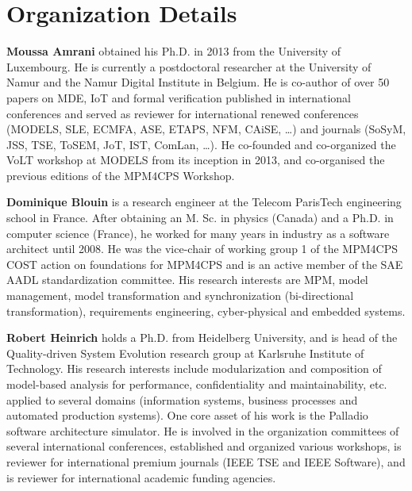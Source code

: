 \section{Organization Details}
\noindent
\textbf{Moussa Amrani} obtained his Ph.D. in 2013 from the University of Luxembourg. He is currently a postdoctoral researcher at the University of Namur and the Namur Digital Institute in Belgium. 
He is co-author of over 50 papers on MDE, IoT and formal verification published in international conferences and served as reviewer for international renewed conferences (MODELS, SLE, ECMFA, ASE, ETAPS, NFM, CAiSE, \ldots) and journals (SoSyM, JSS, TSE, ToSEM, JoT, IST, ComLan, \ldots). He co-founded and co-organized the VoLT workshop at MODELS from its inception in 2013, and co-organised
the previous editions of the MPM4CPS Workshop.

\noindent
\textbf{Dominique Blouin} is a research engineer at the Telecom ParisTech engineering school in France. 
After obtaining an M. Sc. in physics (Canada) and a Ph.D. in computer science (France), he worked for many years in industry as a software architect until 2008. He was the vice-chair of working group 1 of the MPM4CPS COST action on foundations for MPM4CPS and is an active member of the SAE AADL standardization committee. 
His research interests are MPM, model management, model transformation and synchronization (bi-directional transformation), requirements engineering, cyber-physical and embedded systems.

\noindent
\textbf{Robert Heinrich} holds a Ph.D. from Heidelberg University, and is head of the Quality-driven System Evolution research group at Karlsruhe Institute of Technology. His research interests include modularization
and composition of model-based analysis for performance, confidentiality and maintainability, etc. applied to several domains (information systems, business processes and automated production systems). One core asset of his work is the Palladio software architecture simulator. He is involved in the organization committees of several international conferences, established and organized various workshops, is reviewer for international premium journals (IEEE TSE and IEEE Software), and is reviewer for international academic funding agencies.

